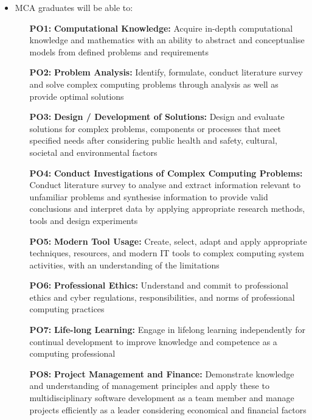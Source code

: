 \documentclass[12pt,a4paper]{article}
\begin{document}
\begin{itemize}
\item  MCA graduates will be able to:
\begin{enumerate}[leftmargin=*,labelindent=05.7mm,labelsep=4mm]
\item[\textbf{PO1:}]\textbf{Computational Knowledge:} Acquire in-depth computational knowledge and  mathematics with an ability to abstract and conceptualise models from defined problems and requirements \vspace{-0.1cm}
\item[\textbf{PO2:}]\textbf{Problem Analysis:}  Identify, formulate, conduct literature survey and solve complex computing problems through analysis as well as provide optimal solutions \vspace{-0.1cm}
\item[\textbf{PO3:}]\textbf{Design / Development of Solutions:} Design and evaluate solutions for complex problems, components or processes that meet specified needs after considering public health and safety, cultural, societal and environmental factors  \vspace{-0.1cm}
\item[\textbf{PO4:}]\textbf{Conduct Investigations of Complex Computing Problems:} Conduct literature survey to analyse and extract information relevant to unfamiliar problems and synthesise information to provide valid conclusions and interpret data by applying appropriate research methods, tools and design experiments \vspace{-0.1cm}
\item[\textbf{PO5:}]\textbf{Modern Tool Usage:} Create, select, adapt and apply appropriate techniques, resources, and modern IT tools to complex computing system activities, with an 
understanding of the limitations \vspace{-0.1cm}
\item[\textbf{PO6:}]\textbf{Professional Ethics:} Understand and commit to professional ethics and cyber  regulations, responsibilities, and norms of professional computing practices \vspace{-0.1cm} 
\item[\textbf{PO7:}]\textbf{Life-long Learning:} Engage in lifelong learning independently for continual development to improve knowledge and competence as a computing professional \vspace{-0.1cm}
\item[\textbf{PO8:}]\textbf{Project Management and Finance:} Demonstrate knowledge and understanding of management principles and apply these to multidisciplinary software development as a team member and manage projects efficiently as a leader considering economical and financial factors \vspace{-0.1cm}

\end{enumerate}
\end{itemize}
\end{document}
